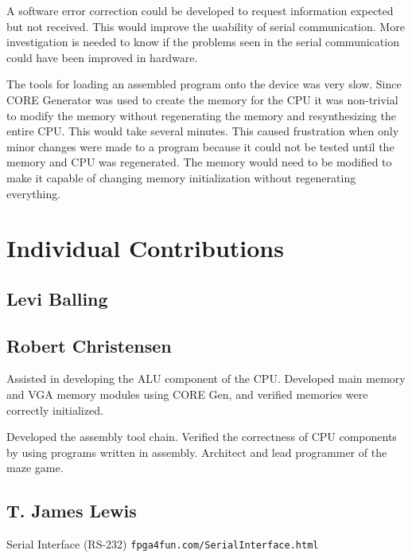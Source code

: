 \documentclass{article}
\begin{document}
A software error correction could be developed to request information expected but not received.  This would improve the usability of serial communication.  More investigation is needed to know if the problems seen in the serial communication could have been improved in hardware.

The tools for loading an assembled program onto the device was very slow.  Since CORE Generator was used to create the memory for the CPU it was non-trivial to modify the memory without regenerating the memory and resynthesizing the entire CPU.  This would take several minutes.  This caused frustration when only minor changes were made to a program because it could not be tested until the memory and CPU was regenerated.  The memory would need to be modified to make it capable of changing memory initialization without regenerating everything.

\section{Individual Contributions}

\subsection{Levi Balling}

\subsection{Robert Christensen}

Assisted in developing the ALU component of the CPU.  Developed main memory and VGA memory modules using CORE Gen, and verified memories were correctly initialized.

Developed the assembly tool chain.  Verified the correctness of CPU components by using programs written in assembly.  Architect and lead programmer of the maze game.

\subsection{T. James Lewis}

\begin{thebibliography}{99}

 Serial Interface (RS-232) \texttt{fpga4fun.com/SerialInterface.html}

\end{thebibliography}
\end{document}
